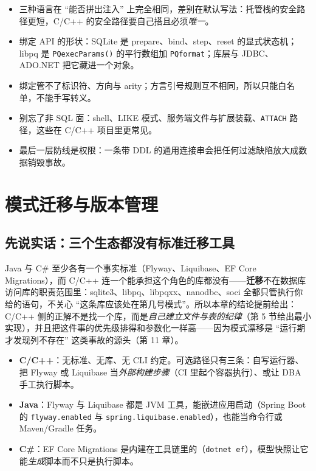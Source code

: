 \documentclass[12pt,a4paper,fontset=fandol]{ctexbook}
\newcommand{\Fn}[1]{\texttt{#1()}}
\newcommand{\Tp}[1]{\texttt{#1}}
\newcommand{\CSharp}{C\#}
\newcommand{\CppJava}{C/C++}
\begin{document}
\begin{guideline}[title=本章要点]
\begin{itemize}
  \item 三种语言在 ``能否拼出注入'' 上完全相同，差别在默认写法：托管栈的安全路径更短，\CppJava{} 的安全路径要自己搭且必须\emph{唯一}。
  \item 绑定 API 的形状：SQLite 是 prepare、bind、step、reset 的显式状态机；libpq 是 \Fn{PQexecParams} 的平行数组加 \Tp{PQformat}；库层与 JDBC、ADO.NET 把它藏进一个对象。
  \item 绑定管不了标识符、方向与 arity；方言引号规则互不相同，所以只能白名单，不能手写转义。
  \item 别忘了非 SQL 面：shell、LIKE 模式、服务端文件与扩展装载、\texttt{ATTACH} 路径，这些在 \CppJava{} 项目里更常见。
  \item 最后一层防线是权限：一条带 DDL 的通用连接串会把任何过滤缺陷放大成数据销毁事故。
\end{itemize}
\end{guideline}

\chapter{模式迁移与版本管理}

\section{先说实话：三个生态都没有标准迁移工具}

Java 与 \CSharp{} 至少各有一个事实标准（Flyway、Liquibase、EF Core Migrations），而 \CppJava{} 连一个能承担这个角色的库都没有——\textbf{迁移}不在数据库访问库的职责范围里：sqlite3、libpq、libpqxx、nanodbc、soci 全都只管执行你给的语句，不关心 ``这条库应该处在第几号模式''。所以本章的结论提前给出：\CppJava{} 侧的正解不是找一个库，而是\emph{自己建立文件与表的纪律}（第 5 节给出最小实现），并且把这件事的优先级排得和参数化一样高——因为模式漂移是 ``运行期才发现列不存在'' 这类事故的源头（第 11 章）。

\begin{compare}[title=三个生态的迁移现状]
\begin{itemize}
  \item \textbf{\CppJava{}}：无标准、无库、无 CLI 约定。可选路径只有三条：自写运行器、把 Flyway 或 Liquibase 当\emph{外部构建步骤}（CI 里起个容器执行）、或让 DBA 手工执行脚本。
  \item \textbf{Java}：Flyway 与 Liquibase 都是 JVM 工具，能嵌进应用启动（Spring Boot 的 \Tp{flyway.enabled} 与 \Tp{spring.\allowbreak liquibase.enabled}），也能当命令行或 Maven/Gradle 任务。
  \item \textbf{\CSharp{}}：EF Core Migrations 是内建在工具链里的（\Tp{dotnet ef}），模型快照让它能\emph{生成}脚本而不只是执行脚本。
\end{itemize}
\end{compare}
\end{document}
